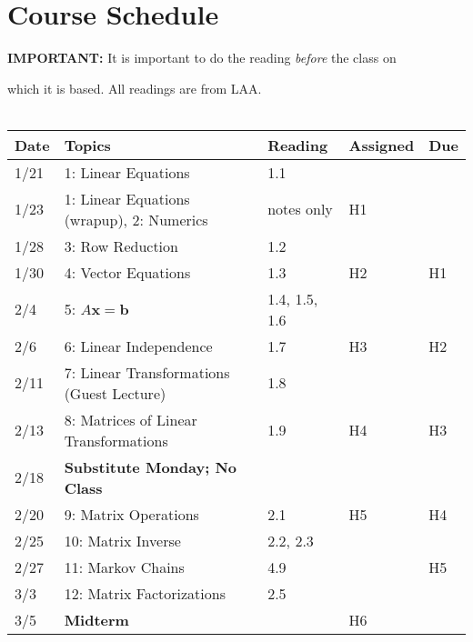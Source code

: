\documentclass[11pt]{article}
\begin{document}
\section*{Course Schedule}

\textbf{IMPORTANT:} It is important to do the reading \emph{before} the class on

which it is based.   All readings are from LAA.
\\~\\
\small
\begin{centering}
\begin{tabular}{||l|p{3in}|l|l|l||}
\hline\hline
Date & Topics  & Reading & Assigned & Due  \\
\hline\hline
1/21 & 1: Linear Equations & 1.1 & & \\
1/23& 1: Linear Equations (wrapup), 2: Numerics &  notes only &  H1 & \\
\hline

1/28 &  3: Row Reduction & 1.2 &  & \\
1/30 & 4: Vector Equations  & 1.3 &  H2 & H1 \\
\hline

2/4 & 5: $A\mathbf{x} =\mathbf{b}$   & 1.4, 1.5, 1.6 &  & \\ %
2/6 & 6: Linear Independence  & 1.7 & H3 & H2 \\
\hline

2/11 & 7: Linear Transformations  (Guest Lecture) &  1.8 & & \\ 
2/13 & 8: Matrices of Linear Transformations & 1.9 & H4 & H3 \\  
\hline

2/18 & \textbf{Substitute Monday; No Class} &&&\\
2/20 &9: Matrix Operations   & 2.1 &  H5 &  H4 \\ 
\hline

2/25 & 10: Matrix Inverse  & 2.2, 2.3 &  &  \\   
2/27 & 11: Markov Chains  &4.9 &  & H5 \\ %
\hline

% 
3/3 & 12: Matrix Factorizations  & 2.5 & &  \\ 
3/5 &  \textbf{Midterm} & &  H6 &  \\ 
  \hline


\end{tabular}
\end{centering}
\end{document}
